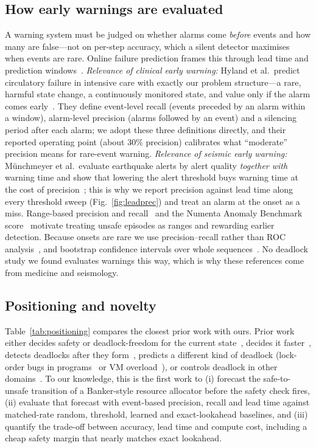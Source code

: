 \documentclass[conference]{IEEEtran}
\begin{document}
\subsection{How early warnings are evaluated}
A warning system must be judged on whether alarms come \emph{before} events and how many are false---not on per-step accuracy, which a silent detector maximises when events are rare. Online failure prediction frames this through lead time and prediction windows~\cite{Salfner2010}. \emph{Relevance of clinical early warning:} Hyland et al.\ predict circulatory failure in intensive care with exactly our problem structure---a rare, harmful state change, a continuously monitored state, and value only if the alarm comes early~\cite{Hyland2020}. They define event-level recall (events preceded by an alarm within a window), alarm-level precision (alarms followed by an event) and a silencing period after each alarm; we adopt these three definitions directly, and their reported operating point (about 30\% precision) calibrates what ``moderate'' precision means for rare-event warning. \emph{Relevance of seismic early warning:} Münchmeyer et al.\ evaluate earthquake alerts by alert quality \emph{together with} warning time and show that lowering the alert threshold buys warning time at the cost of precision~\cite{Munchmeyer2021}; this is why we report precision against lead time along every threshold sweep (Fig.~\ref{fig:leadprec}) and treat an alarm at the onset as a miss. Range-based precision and recall~\cite{Tatbul2018} and the Numenta Anomaly Benchmark score~\cite{Lavin2015} motivate treating unsafe episodes as ranges and rewarding earlier detection. Because onsets are rare we use precision--recall rather than ROC analysis~\cite{Saito2015,Davis2006}, and bootstrap confidence intervals over whole sequences~\cite{Efron1993}. No deadlock study we found evaluates warnings this way, which is why these references come from medicine and seismology.

\subsection{Positioning and novelty}
Table~\ref{tab:positioning} compares the closest prior work with ours. Prior work either decides safety or deadlock-freedom for the current state~\cite{Gold1978,Minoura1982,Kameda1980}, decides it faster~\cite{Belik1987,Finkel1987,Zohora2024}, detects deadlocks after they form~\cite{Agrawal1983,Chandy1983}, predicts a different kind of deadlock (lock-order bugs in programs~\cite{Kalhauge2018,Tunc2023} or VM overload~\cite{LeNgoc2023}), or controls deadlock in other domains~\cite{Ezpeleta1995,Li2008}. To our knowledge, this is the first work to (i) forecast the safe-to-unsafe transition of a Banker-style resource allocator before the safety check fires, (ii) evaluate that forecast with event-based precision, recall and lead time against matched-rate random, threshold, learned and exact-lookahead baselines, and (iii) quantify the trade-off between accuracy, lead time and compute cost, including a cheap safety margin that nearly matches exact lookahead.
\end{document}
